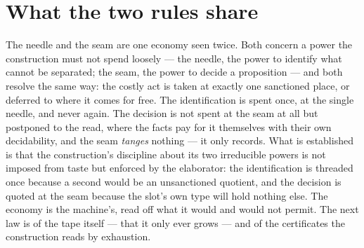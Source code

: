 \section{What the two rules share}
\label{se:what-the-two-rules-share}

The needle and the seam are one economy seen twice. Both concern a power the construction must not spend
loosely --- the needle, the power to identify what cannot be separated; the seam, the power to decide a
proposition --- and both resolve the same way: the costly act is taken at exactly one sanctioned place, or
deferred to where it comes for free. The identification is spent once, at the single needle, and never
again. The decision is not spent at the seam at all but postponed to the read, where the facts pay for it
themselves with their own decidability, and the seam \emph{tanges} nothing --- it only records. What is
established is that the construction's discipline about its two irreducible powers is not imposed from
taste but enforced by the elaborator: the identification is threaded once because a second would be an
unsanctioned quotient, and the decision is quoted at the seam because the slot's own type will hold nothing
else. The economy is the machine's, read off what it would and would not permit. The next law is of the
tape itself --- that it only ever grows --- and of the certificates the construction reads by exhaustion.
